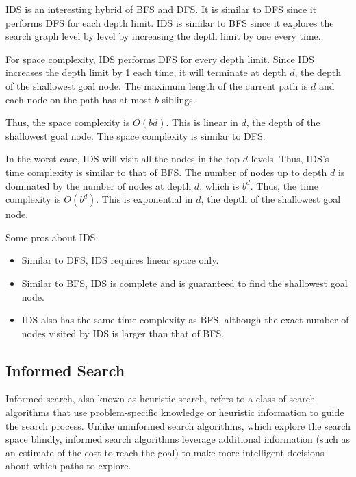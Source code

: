                     IDS is an interesting hybrid of BFS and DFS. It is similar to DFS since it performs DFS for each depth limit. IDS is similar to BFS since it explores the search graph level by level by increasing the depth limit by one every time.

                    For space complexity, IDS performs DFS for every depth limit. Since IDS increases the depth limit by 1 each time, it will terminate at depth $d$, the depth of the shallowest goal node. The maximum length of the current path is $d$ and each node on the path has at most $b$ siblings.

                    Thus, the space complexity is $O(bd)$. This is linear in $d$, the depth of the shallowest goal node. The space complexity is similar to DFS.

                    In the worst case, IDS will visit all the nodes in the top $d$ levels. Thus, IDS’s time complexity is similar to that of BFS. The number of nodes up to depth $d$ is dominated by the number of nodes at depth $d$, which is $b^d$. Thus, the time complexity is $O(b^d)$. This is exponential in $d$, the depth of the shallowest goal node.

                    Some pros about IDS:

                    \begin{itemize}
                        \item Similar to DFS, IDS requires linear space only.
                        \item Similar to BFS, IDS is complete and is guaranteed to find the shallowest goal node.
                        \item IDS also has the same time complexity as BFS, although the exact number of nodes visited by IDS is larger than that of BFS.
                    \end{itemize}

            \subsection{Informed Search}
                Informed search, also known as heuristic search, refers to a class of search algorithms that use problem-specific knowledge or heuristic information to guide the search process. Unlike uninformed search algorithms, which explore the search space blindly, informed search algorithms leverage additional information (such as an estimate of the cost to reach the goal) to make more intelligent decisions about which paths to explore.

